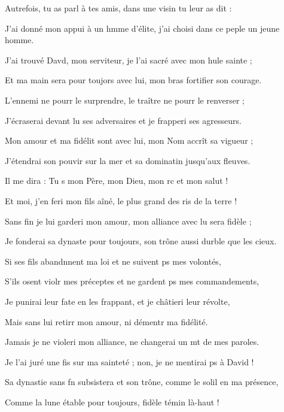 \item Autrefois, tu as parl à tes amis,\psstar{} dans une visin tu leur as dit : 
\item J’ai donné mon appui à un hmme d’élite,\psstar{} j’ai choisi dans ce peple un jeune homme.
\item J’ai trouvé Davd, mon serviteur,\psstar{} je l’ai sacré avec mon hule sainte ;
\item Et ma main sera pour toujors avec lui,\psstar{} mon bras fortifier son courage.
\item L’ennemi ne pourr le surprendre,\psstar{} le traître ne pourr le renverser ;
\item J’écraserai devant lu ses adversaires\psstar{} et je frapperi ses agresseurs.
\item Mon amour et ma fidélit sont avec lui,\psstar{} mon Nom accrît sa vigueur ;
\item J’étendrai son pouvir sur la mer\psstar{} et sa dominatin jusqu’aux fleuves.
\item Il me dira : Tu s mon Père,\psstar{} mon Dieu, mon rc et mon salut !
\item Et moi, j’en feri mon fils aîné,\psstar{} le plus grand des ris de la terre !
\item Sans fin je lui garderi mon amour,\psstar{} mon alliance avec lu sera fidèle ;
\item Je fonderai sa dynaste pour toujours,\psstar{} son trône aussi durble que les cieux.
\item Si ses fils abandnnent ma loi\psstar{} et ne suivent ps mes volontés,
\item S’ils osent violr mes préceptes\psstar{} et ne gardent ps mes commandements,
\item Je punirai leur fate en les frappant,\psstar{} et je châtieri leur révolte,
\item Mais sans lui retirr mon amour,\psstar{} ni démentr ma fidélité.
\item Jamais je ne violeri mon alliance,\psstar{} ne changerai un mt de mes paroles.
\item Je l’ai juré une fis sur ma sainteté ;\psstar{} non, je ne mentirai ps à David !
\item Sa dynastie sans fn subsistera\psstar{} et son trône, comme le solil en ma présence,
\item Comme la lune étable pour toujours,\psstar{} fidèle témin là-haut !